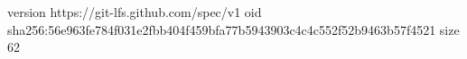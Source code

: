 version https://git-lfs.github.com/spec/v1
oid sha256:56e963fe784f031e2fbb404f459bfa77b5943903c4c4c552f52b9463b57f4521
size 62
